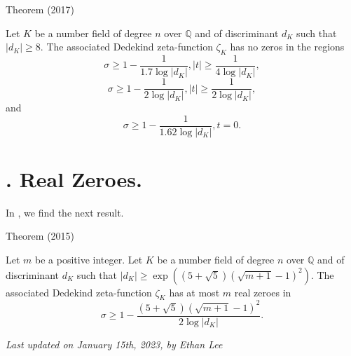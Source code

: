 \par 
\begin{thm}{Theorem (2017)}

Let $K$ be a number field of degree $n$ over $\mathbb{Q}$ and of
discriminant $d_K$ such that $|d_K| \ge 8$. The associated Dedekind
zeta-function $\zeta_K$ has no zeros in the regions
$$
\sigma\ge 1-\frac{1}{1.7\log|d_K|}, |t|\ge\frac{1}{4\log|d_K|},
$$
$$
\sigma\ge 1-\frac{1}{2\log|d_K|}, |t|\ge\frac{1}{2\log|d_K|},
$$
and
$$
\sigma\ge 1-\frac{1}{1.62\log|d_K|}, t=0.
$$
\end{thm}



\section{. Real Zeroes.}


In
\cite{Louboutin*15b},
we find the next result.

\par 
\begin{thm}{Theorem (2015)}

Let $m$ be a positive integer.
  Let $K$ be a number field of degree $n$ over $\mathbb{Q}$ and of
discriminant $d_K$ such that $|d_K|\ge
\exp((5+\sqrt{5})(\sqrt{m+1}-1)^2)$.
The associated Dedekind
zeta-function $\zeta_K$ has at most $m$ real zeroes in
$$
\sigma\ge 1-\frac{(5+\sqrt{5})(\sqrt{m+1}-1)^2}{2\log|d_K|}.
$$
\end{thm}







  
\begin{flushright}\small\sl{}   Last updated on January 15th, 2023, by Ethan Lee
 \end{flushright}















